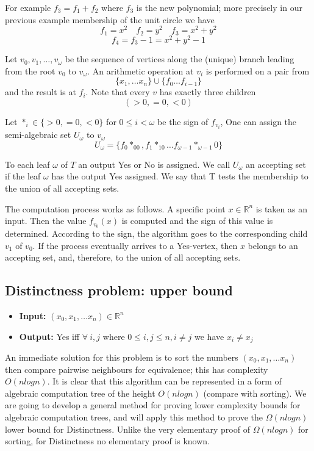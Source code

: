 For example $f_3 = f_1 + f_2$ where $f_3$ is the new polynomial;
more precisely in our previous example membership of the unit circle
we have
$$f_1 = x^2 \quad f_2 = y^2 \quad f_3 = x^2 + y^2$$
$$f_4 = f_3 - 1 = x^2 + y^2 - 1$$

Let $v_0, v_1,\dots, v_\omega$ be the sequence of vertices
along the (unique) branch leading from the root $v_0$ to $v_\omega$.
An arithmetic operation at $v_i$ is performed on a pair from
$$\{x_1,\dots x_n\} \cup \{f_0\dots f_{i - 1}\}$$
and the result is at $f_i$.
Note that every $v$ has exactly three children
$$(> 0, = 0, < 0)$$

Let $*_i \in \{>0,=0,<0\}$ for $0 \leq i < \omega$ be the sign of $f_{v_i}$,
One can assign the semi-algebraic set $U_\omega$ to $v_\omega$
$$U_\omega = \{f_0*_00,f_1*_10\dots f_{\omega - 1} *_{\omega - 1}0\}$$

To each leaf $\omega$ of $T$ an output Yes or No is assigned.
We call $U_\omega$ an accepting set if the leaf $\omega$ has the output Yes assigned.
We say that T tests the membership to the union of all accepting sets.

The computation process works as follows.
A specific point $x \in \mathbb{R}^n$ is taken as an input.
Then the value $f_{v_0}(x)$ is computed and the sign of this value is determined.
According to the sign, the algorithm goes to the corresponding child $v_1$ of $v_0$.
If the process eventually arrives to a Yes-vertex, then $x$ belongs to an accepting set,
and, therefore, to the union of all accepting sets.

\subsection{Distinctness problem: upper bound}
\begin{itemize}
    \item \textbf{Input:} $(x_0, x_1,\dots x_n) \in \mathbb{R}^n$
    \item \textbf{Output:} Yes iff $\forall\ i,j$ where $0 \leq i,j \leq n, i \neq j$ we have $x_i \neq x_j$
\end{itemize}
An immediate solution for this problem is to sort the numbers $(x_0, x_1,\dots x_n)$
then compare pairwise neighbours for equivalence; this has complexity $O(nlogn)$.
It is clear that this algorithm can be represented in a form of algebraic computation tree
of the height $O(nlogn)$ (compare with sorting).
We are going to develop a general method for proving lower complexity bounds for algebraic computation trees,
and will apply this method to prove the $\Omega(nlogn)$ lower bound for Distinctness.
Unlike the very elementary proof of $\Omega(nlogn)$ for sorting,
for Distinctness no elementary proof is known.

